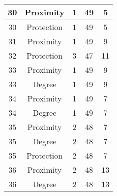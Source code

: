 \documentclass[results.tex]{subfiles}
\begin{document}
\begin{center}
\begin{tabular}{| c || c | c | c | c |}
            \hline
            30                      & Proximity                    & 1                      & 49                      & 5                    \\
            \hline
            30                      & Protection                   & 1                      & 49                      & 5                    \\
            \hline
            31                      & Proximity                    & 1                      & 49                      & 9                    \\
            \hline
            32                      & Protection                   & 3                      & 47                      & 11                   \\
            \hline
            33                      & Proximity                    & 1                      & 49                      & 9                    \\
            \hline
            33                      & Degree                       & 1                      & 49                      & 9                    \\
            \hline
            34                      & Proximity                    & 1                      & 49                      & 7                    \\
            \hline
            34                      & Degree                       & 1                      & 49                      & 7                    \\
            \hline
            35                      & Proximity                    & 2                      & 48                      & 7                    \\
            \hline
            35                      & Degree                       & 2                      & 48                      & 7                    \\
            \hline
            35                      & Protection                   & 2                      & 48                      & 7                    \\
            \hline
            36                      & Proximity                    & 2                      & 48                      & 13                   \\
            \hline
            36                      & Degree                       & 2                      & 48                      & 13                   \\

\end{tabular}
\end{center}
\end{document}
